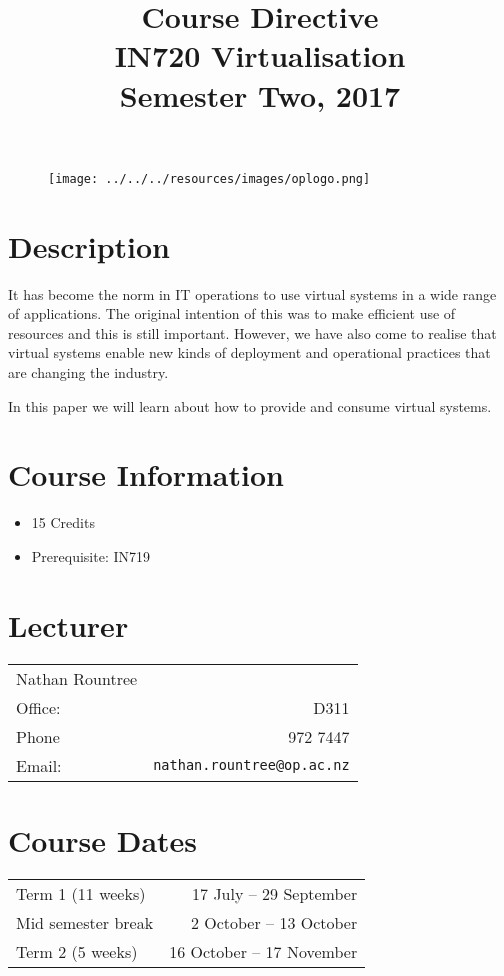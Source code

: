 \documentclass{article}
\begin{document}
\begin{figure}
\texttt{[image: ../../../resources/images/oplogo.png]}
\end{figure}

\title{Course Directive\\IN720 Virtualisation\\Semester Two, 2017}
\date{}
\maketitle

\section*{Description}
It has become the norm in IT operations to use virtual systems in a wide range of applications.  The original intention of this was to make efficient use of resources and this is still important.  However, we have also come to realise that virtual systems enable new kinds of deployment and operational practices that are changing the industry.

In this paper we will learn about how to provide and consume virtual systems.

\section*{Course Information}
\begin{itemize}
  \item 15 Credits
  \item Prerequisite: IN719
\end{itemize}

\section*{Lecturer}
\begin{tabular}{lr}

  Nathan Rountree &    \\
     Office: & D311 \\
     Phone & 972 7447 \\
     Email: & \texttt{nathan.rountree@op.ac.nz} \\
\end{tabular}

\section*{Course Dates}
\begin{tabular}{lr}
Term 1 (11 weeks) & 17 July -- 29 September \\
Mid semester break & 2 October -- 13 October \\
Term 2 (5 weeks) & 16 October -- 17 November \\
\end{tabular}
\end{document}
